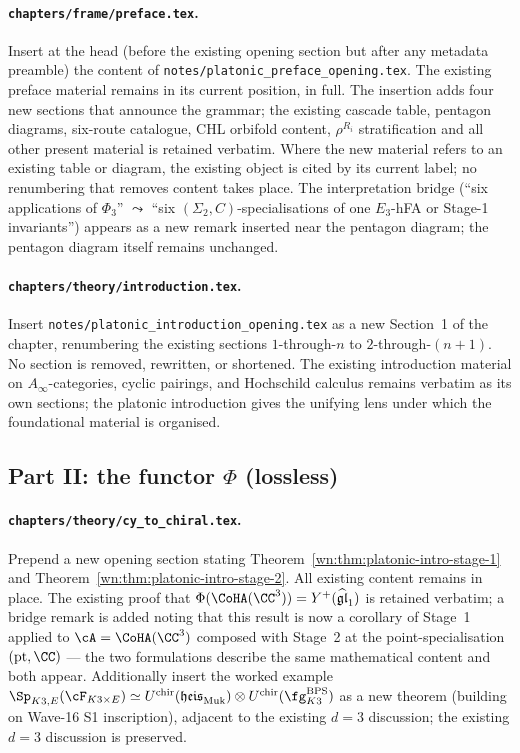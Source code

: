\paragraph{\texttt{chapters/frame/preface.tex}.} Insert at the head
(before the existing opening section but after any metadata
preamble) the content of \texttt{notes/platonic\_preface\_opening.tex}.
The existing preface material remains in its current position,
in full. The insertion adds four new sections that announce the
grammar; the existing cascade table, pentagon diagrams, six-route
catalogue, CHL orbifold content, $\rho^{R_i}$ stratification and
all other present material is retained verbatim. Where the new
material refers to an existing table or diagram, the existing
object is cited by its current label; no renumbering that removes
content takes place. The interpretation bridge (``six applications
of $\Phi_3$'' $\leadsto$ ``six $(\Sigma_2, C)$-specialisations of
one $E_3$-hFA or Stage-1 invariants'') appears as a new remark
inserted near the pentagon diagram; the pentagon diagram itself
remains unchanged.

\paragraph{\texttt{chapters/theory/introduction.tex}.} Insert
\texttt{notes/platonic\_introduction\_opening.tex} as a new Section~1
of the chapter, renumbering the existing sections $1$-through-$n$ to
$2$-through-$(n+1)$. No section is removed, rewritten, or
shortened. The existing introduction material on $A_\infty$-categories,
cyclic pairings, and Hochschild calculus remains verbatim as its
own sections; the platonic introduction gives the unifying lens
under which the foundational material is organised.

\subsection*{Part II: the functor $\Phi$ (lossless)}

\paragraph{\texttt{chapters/theory/cy\_to\_chiral.tex}.} Prepend a
new opening section stating
Theorem~\ref{wn:thm:platonic-intro-stage-1} and
Theorem~\ref{wn:thm:platonic-intro-stage-2}. All existing content
remains in place. The existing proof that
$\Phi(\CoHA(\CC^3)) = Y^+(\widehat{\mathfrak{gl}}_1)$ is
retained verbatim; a bridge remark is added noting that this result
is now a corollary of Stage~1 applied to $\cA = \CoHA(\CC^3)$
composed with Stage~2 at the point-specialisation
$(\mathrm{pt}, \CC)$ --- the two formulations describe the same
mathematical content and both appear. Additionally insert the
worked example
$\Sp_{K3, E}(\cF_{K3 \times E}) \simeq
U^{\mathrm{chir}}(\mathfrak{heis}_{\mathrm{Muk}}) \otimes
U^{\mathrm{chir}}(\fg^{\mathrm{BPS}}_{K3})$ as a new theorem
(building on Wave-16 S1 inscription), adjacent to the existing
$d = 3$ discussion; the existing $d = 3$ discussion is preserved.

